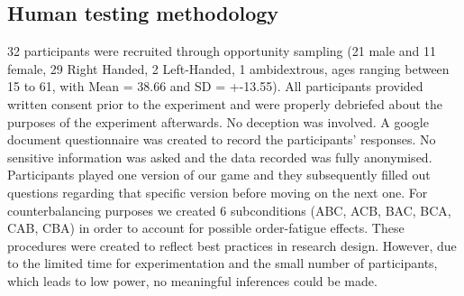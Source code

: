 \subsection{Human testing methodology}

32 participants were recruited through opportunity sampling (21 male and 11 female, 29 Right Handed, 2 Left-Handed, 1 ambidextrous, ages ranging between 15 to 61, with Mean = 38.66 and SD = +-13.55). All participants provided written consent prior to the experiment and were properly debriefed about the purposes of the experiment afterwards. No deception was involved. A google document questionnaire was created to record the participants’ responses. No sensitive information was asked and the data recorded was fully anonymised. Participants played one version of our game and they subsequently filled out questions regarding that specific version before moving on the next one. For counterbalancing purposes we created 6 subconditions (ABC, ACB, BAC, BCA, CAB, CBA) in order to account for possible order-fatigue effects. These procedures were created to reflect best practices in research design. However, due to the limited time for experimentation and the small number of participants, which leads to low power, no meaningful inferences could be made.